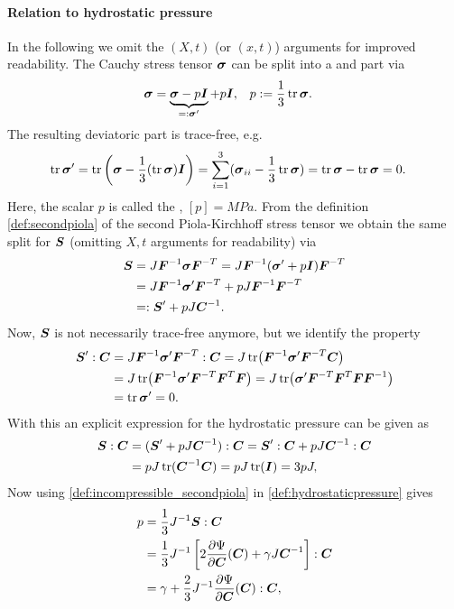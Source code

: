 \paragraph{Relation to hydrostatic pressure}
In the following we omit the $(X,t)$ (or $(x,t)$) arguments for improved readability.
The Cauchy stress tensor $\vsig$ can be split into a  and  part via
\begin{align}
	\vsig &= \underbrace{\vsig - p\vI}_{=:\vsig'} + p\vI, & p &:= \frac{1}{3}\tr\vsig.
\end{align}
The resulting deviatoric part is trace-free, e.g.
\begin{align}
	\tr{\vsig'} &= \tr\left(\vsig - \frac{1}{3}(\tr\vsig)\vI\right) = \suml{i=1}{3}(\vsig_{ii} - \frac{1}{3}\tr\vsig) = \tr\vsig - \tr\vsig = 0.
\end{align}
Here, the scalar $p$ is called the , $[p] = MPa$.
From the definition \eqref{def:secondpiola} of the second Piola-Kirchhoff stress tensor we obtain the same split for $\vS$
(omitting $X,t$ arguments for readability) via
\begin{align}
	\vS &= J\vF^{-1}\vsig\vF^{-T} = J\vF^{-1}(\vsig' + p\vI)\vF^{-T}\\
		&= J\vF^{-1}\vsig'\vF^{-T} + pJ\vF^{-1}\vF^{-T}\\
		&=: \vS' + pJ\vC^{-1}.
\end{align}
Now, $\vS$ is not necessarily trace-free anymore, but we identify the property
\begin{align}
	\vS' : \vC &= J\vF^{-1}\vsig'\vF^{-T} : \vC = J\tr\bigl(\vF^{-1}\vsig'\vF^{-T}\vC\bigr)\\
		&= J\tr\bigl(\vF^{-1}\vsig'\vF^{-T}\vF^T\vF\bigr) = J\tr\bigl(\vsig'\vF^{-T}\vF^T\vF\vF^{-1}\bigr)\\
		&= \tr\vsig' = 0.
\end{align}
With this an explicit expression for the hydrostatic pressure can be given as
\begin{align}
	\vS : \vC &= (\vS' + pJ\vC^{-1}) : \vC = \vS': \vC + pJ\vC^{-1} : \vC\\
	&= pJ\tr(\vC^{-1}\vC) = pJ\tr(\vI) = 3pJ,\label{def:hydrostaticpressure}
\end{align}
Now using \eqref{def:incompressible_secondpiola} in \eqref{def:hydrostaticpressure} gives
\begin{align}
	p &= \frac{1}{3}J^{-1}\vS : \vC\\
	  &= \frac{1}{3}J^{-1}\left[2\d{\Psi}{\vC}(\vC) + \gamma J\vC^{-1}\right] : \vC\\
	  &= \gamma + \frac{2}{3}J^{-1}\d{\Psi}{\vC}(\vC):\vC,
\end{align}
